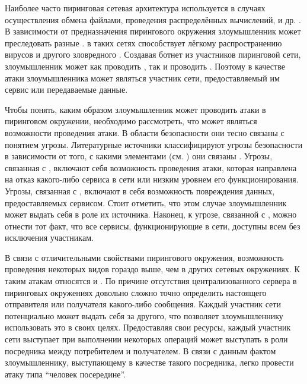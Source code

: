 %
Наиболее часто пиринговая сетевая архитектура используется в случаях осуществления обмена файлами, проведения распределённых вычислений,  и др. .
%
%
В зависимости от предназначения пирингового окружения злоумышленник может преследовать разные   . 
%
 в таких сетях способствует лёгкому распространению вирусов и другого зловредного . 
%
Создавая ботнет из участников пиринговой сети, злоумышленник может как проводить , так и проводить . 
%
Поэтому в качестве  атаки злоумышленника может являться участник сети, предоставляемый им сервис или передаваемые данные. 

%
Чтобы понять, каким образом злоумышленник может проводить атаки в пиринговом окружении, необходимо рассмотреть, что может являться  возможности проведения атаки.
%
В области безопасности они тесно связаны с понятием угрозы.
%
Литературные источники классифицируют угрозы безопасности в зависимости от того, с какими элементами  (см. ) они связаны   . 
%
Угрозы, связанная с , включают себя возможность проведения атаки, которая направлена на отказ какого-либо сервиса в сети или низким уровнем его функционирования. 
%
Угрозы, связанная с , включают в себя возможность повреждения данных, предоставляемых сервисом. 
%
Стоит отметить, что этом случае злоумышленник может выдать себя в роле их источника. 
%
Наконец, к угрозе, связанной с , можно отнести тот факт, что все сервисы, функционирующие в сети, доступны всем без исключения участникам.

%
В связи с отличительными свойствами пирингового окружения, возможность проведения некоторых видов  гораздо выше, чем в других сетевых окружениях. 
%
К таким атакам относятся  и  . 
%
По причине отсутствия централизованного сервера в пиринговых окружениях довольно сложно точно определить настоящего отправителя или получателя какого-либо сообщения.
%
Каждый участник сети потенциально может выдать себя за другого, что позволяет злоумышленнику использовать это в своих целях.  
%
Предоставляя свои ресурсы, каждый участник сети выступает при выполнении некоторых операций может выступать в роли посредника между потребителем и получателем.
%
В связи с данным фактом злоумышленнику, выступающему в качестве такого посредника, легко провести атаку типа ``человек посередине''. 


